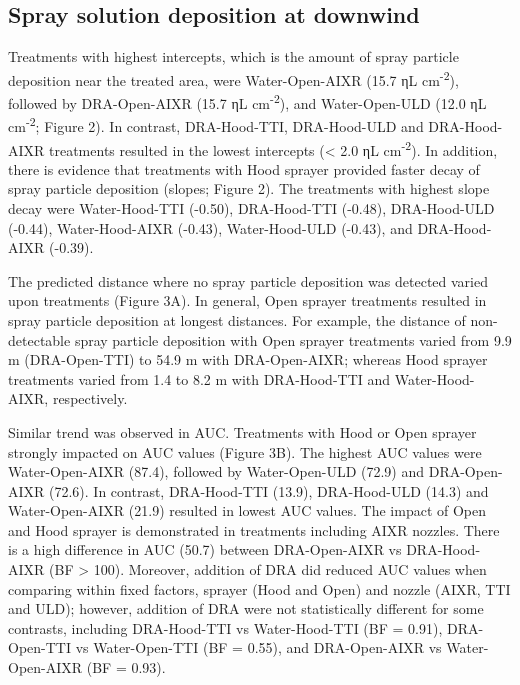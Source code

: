 \documentclass[
  12pt,
  a4paper,
]{article}
\begin{document}
\hypertarget{spray-solution-deposition-at-downwind-1}{%
\subsection{Spray solution deposition at
downwind}\label{spray-solution-deposition-at-downwind-1}}

Treatments with highest intercepts, which is the amount of spray
particle deposition near the treated area, were Water-Open-AIXR (15.7 ηL
cm\textsuperscript{-2}), followed by DRA-Open-AIXR (15.7 ηL
cm\textsuperscript{-2}), and Water-Open-ULD (12.0 ηL
cm\textsuperscript{-2}; Figure 2). In contrast, DRA-Hood-TTI,
DRA-Hood-ULD and DRA-Hood-AIXR treatments resulted in the lowest
intercepts (\textless{} 2.0 ηL cm\textsuperscript{-2}). In addition,
there is evidence that treatments with Hood sprayer provided faster
decay of spray particle deposition (slopes; Figure 2). The treatments
with highest slope decay were Water-Hood-TTI (-0.50), DRA-Hood-TTI
(-0.48), DRA-Hood-ULD (-0.44), Water-Hood-AIXR (-0.43), Water-Hood-ULD
(-0.43), and DRA-Hood-AIXR (-0.39).

The predicted distance where no spray particle deposition was detected
varied upon treatments (Figure 3A). In general, Open sprayer treatments
resulted in spray particle deposition at longest distances. For example,
the distance of non-detectable spray particle deposition with Open
sprayer treatments varied from 9.9 m (DRA-Open-TTI) to 54.9 m with
DRA-Open-AIXR; whereas Hood sprayer treatments varied from 1.4 to 8.2 m
with DRA-Hood-TTI and Water-Hood-AIXR, respectively.

Similar trend was observed in AUC. Treatments with Hood or Open sprayer
strongly impacted on AUC values (Figure 3B). The highest AUC values were
Water-Open-AIXR (87.4), followed by Water-Open-ULD (72.9) and
DRA-Open-AIXR (72.6). In contrast, DRA-Hood-TTI (13.9), DRA-Hood-ULD
(14.3) and Water-Open-AIXR (21.9) resulted in lowest AUC values. The
impact of Open and Hood sprayer is demonstrated in treatments including
AIXR nozzles. There is a high difference in AUC (50.7) between
DRA-Open-AIXR vs DRA-Hood-AIXR (BF \textgreater{} 100). Moreover,
addition of DRA did reduced AUC values when comparing within fixed
factors, sprayer (Hood and Open) and nozzle (AIXR, TTI and ULD);
however, addition of DRA were not statistically different for some
contrasts, including DRA-Hood-TTI vs Water-Hood-TTI (BF = 0.91),
DRA-Open-TTI vs Water-Open-TTI (BF = 0.55), and DRA-Open-AIXR vs
Water-Open-AIXR (BF = 0.93).
\end{document}
